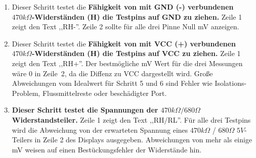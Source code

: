 \begin{enumerate}
\item Dieser Schritt testet die {\bf Fähigkeit von mit GND (-) verbundenen \(470k\Omega\)-Widerständen (H) die Testpins auf GND zu ziehen.}
Zeile 1 zeigt den Text ,,RH-''.
Zeile 2 sollte für alle drei Pinne  Null mV anzeigen.

\item Dieser Schritt testet die {\bf Fähigkeit von mit VCC (+) verbundenen \(470k\Omega\)-Widerständen (H) die Testpins auf VCC zu ziehen.}
Zeile 1 zeigt den Text ,,RH+''.
Der bestmögliche mV Wert für die drei Messungen wäre 0 in Zeile~2, da die Diffenz zu VCC dargestellt wird.
Große Abweichungen vom Idealwert für Schritt 5 und 6 sind Fehler wie Isolations-Problem, Flussmittelreste oder beschädigter Port.

\item {\bf Dieser Schritt testet die Spannungen der \(470k\Omega / 680\Omega\)  Widerstandsteiler.}
Zeile 1 zeigt den Text ,,RH/RL''.
Für alle drei Testpins wird die Abweichung von der erwarteten Spannung eines \(470k\Omega\) / \(680\Omega\) \(5V\)-Teilers 
in Zeile 2 des Displays ausgegeben.
Abweichungen von mehr als einige mV weisen auf einen Bestückungsfehler der Widerstände hin.


\end{enumerate}
